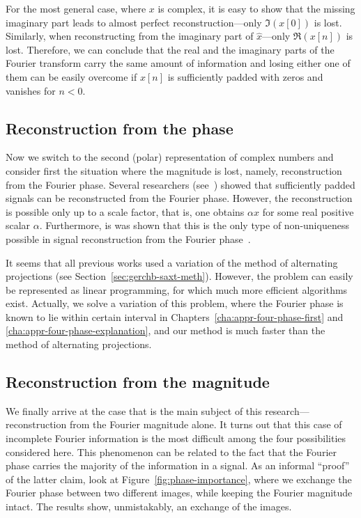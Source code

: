 For the most general case, where $x$ is complex, it is easy to show
that the missing imaginary part leads to almost perfect
reconstruction---only $\Im(x[0])$ is lost. Similarly, when
reconstructing from the imaginary part of $\hat{x}$---only $\Re(x[n])$
is lost. Therefore, we can conclude that the real and the imaginary
parts of the Fourier transform carry the same amount of information and
losing either one of them can be easily overcome if $x[n]$ is
sufficiently padded with zeros and vanishes for $n<0$.


\subsection{Reconstruction from the phase}
\label{sec:reconstr-from-phase}
Now we switch to the second (polar) representation of complex numbers and
consider first the situation where the magnitude is lost, namely,
reconstruction from the Fourier phase. Several researchers
(see~)
showed that sufficiently padded signals can be reconstructed from the
Fourier phase. However, the reconstruction is possible only up to
a scale factor, that is, one obtains  $\alpha x$ for some
real positive scalar $\alpha$. Furthermore, is was shown that this is
the only type of non-uniqueness possible in signal reconstruction from
the Fourier phase~.

It seems that all previous works used a variation of the method
of alternating projections (see
Section~\ref{sec:gerchb-saxt-meth}). However, the problem can easily
be represented as linear programming, for which much more efficient
algorithms exist. Actually, we solve a variation of this problem, where
the Fourier phase is known to lie within  certain interval in
Chapters~\ref{cha:appr-four-phase-first} and
\ref{cha:appr-four-phase-explanation}, and our method is much faster
than the method of alternating projections. 

\subsection{Reconstruction from the magnitude}
\label{sec:reconstr-from-magn}
We finally arrive at the case that is the main subject of this
research---reconstruction from the Fourier magnitude alone. It turns
out that this case of incomplete Fourier information is the most
difficult among the four possibilities considered here. This
phenomenon can be related to the fact that the Fourier phase carries
the majority of the information in a signal. As an informal ``proof''
of the latter claim, look at Figure~\ref{fig:phase-importance}, where
we exchange the Fourier phase between two different images, while
keeping the Fourier magnitude intact. The results show, unmistakably,
an exchange of the images.

